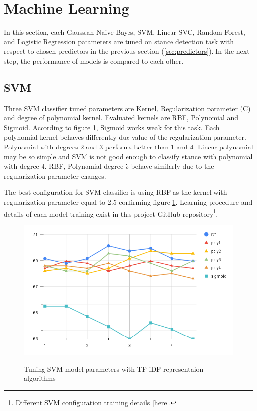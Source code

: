 \section{Machine Learning}
In this section, each Gaussian Naive Bayes, SVM, Linear SVC, Random Forest, and Logistic Regression parameters are tuned on stance detection task with respect to chosen predictors in the previous section (\ref{sec:predictors}). In the next step, the performance of models is compared to each other.

\subsection{SVM}
Three SVM classifier tuned parameters  are Kernel, Regularization parameter (C) and degree of polynomial kernel. Evaluated kernels are RBF, Polynomial and Sigmoid. According to figure \ref{fig:svm}, Sigmoid works weak for this task. Each polynomial kernel behaves differently due value of the regularization parameter. Polynomial with degrees 2 and 3 performs better than 1 and 4. Linear polynomial may be so simple and SVM is not good enough to classify stance with polynomial with degree 4. RBF, Polynomial degree 3 behave similarly due to the regularization parameter changes. 

The best configuration for SVM classifier is using RBF as the kernel with regularization parameter equal to 2.5 confirming figure \ref{fig:svm}. Learning procedure and details of each model training exist in this project GitHub repository\footnote{Different SVM configuration training details \href{https://github.com/mahsaghn/stance\_detection/tree/main/selected\_outputs/machinelearning/svm}{[here]}.}.

\begin{figure}%
	\centering
	{\includegraphics[width=12.5cm]{statistics/svm.png} }
	\caption{Tuning SVM model parameters with TF-iDF representaion algorithms}%
	\label{fig:svm}%
\end{figure}


